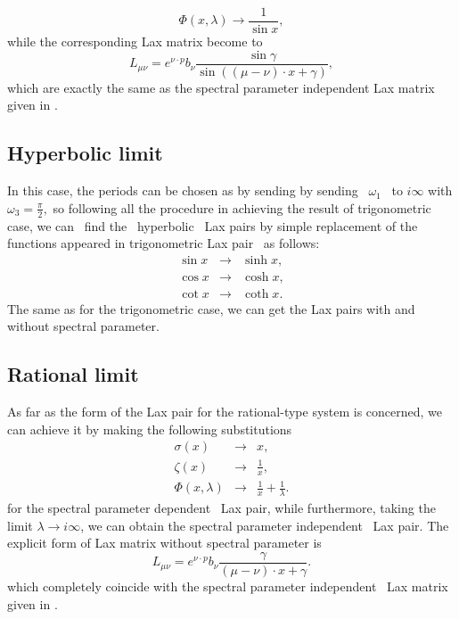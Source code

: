 \documentclass[a4paper,12pt]{article}
\begin{document}
\begin{equation}
\Phi (x,\lambda )\rightarrow \frac{1}{\sin x},
\end{equation}
while the corresponding Lax matrix become to
\begin{equation}
L_{\mu \nu }=e^{\nu \cdot p}b_{\nu }\frac{\sin \gamma }{\sin
((\mu -\nu )\cdot x+\gamma )},	\label{trigL}
\end{equation}
which are exactly the same as the spectral parameter
independent Lax matrix given in \cite{Che00}.

\subsection{Hyperbolic limit}

In this case, the periods can be chosen as by sending by
sending \ $\omega
_{1}$ \ to $i\infty $ with $\omega _{3}=\frac{\pi }{2},$ so following all
the procedure in achieving the result of trigonometric case,
we can \ find the \ hyperbolic \ Lax pairs by simple
replacement of the functions appeared in trigonometric Lax
pair \ as follows:
\begin{eqnarray}
\sin x &\rightarrow &\sinh x,  \nonumber \\
\cos x &\rightarrow &\cosh x, \\
\cot x &\rightarrow &\coth x.  \nonumber
\end{eqnarray}
The same as for the trigonometric case, we can get the Lax
pairs with and without spectral parameter.

\subsection{Rational limit}

As far as the form of the Lax pair for the rational-type
system is concerned, we can achieve it by making the
following substitutions
\begin{eqnarray}
\sigma (x) &\rightarrow &x,  \nonumber \\
\zeta (x) &\rightarrow &\frac{1}{x}, \\
\Phi (x,\lambda ) &\rightarrow &\frac{1}{x}+\frac{1}{\lambda }.	 \nonumber
\end{eqnarray}
for the spectral parameter dependent \ Lax pair, while
furthermore, taking the limit $\lambda \rightarrow i\infty
$, we can obtain the spectral parameter independent \ Lax
pair. The explicit form of Lax matrix without spectral
parameter is
\begin{equation}
L_{\mu \nu }=e^{\nu \cdot p}b_{\nu }\frac{\gamma }{(\mu -\nu
)\cdot x+\gamma }.  \label{ratiL}
\end{equation}
which completely coincide with the spectral parameter
independent \ Lax matrix given in \cite{Che00}.
\end{document}
